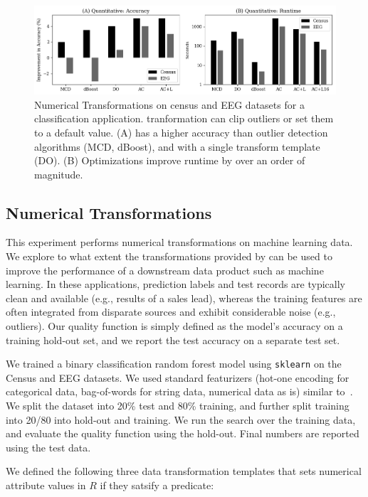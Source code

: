 \begin{figure}
    \centering
    \includegraphics[width=\columnwidth]{exp/exp2.png}
    \caption{\small Numerical Transformations on census and EEG datasets for a classification application.  \sys tranformation can clip outliers or set them to a default value. (A) \sys has a higher accuracy than outlier detection algorithms (MCD, dBoost), and \sys with a single transform template (DO).  (B) Optimizations improve \sys runtime by over an order of magnitude.  \label{exp2a}}
\end{figure}

\subsection{Numerical Transformations}\label{s:expquant}
This experiment performs numerical transformations on machine learning data.  We explore to what extent the transformations provided by \sys can be used to improve the performance of a downstream data product such as machine learning. In these applications, prediction labels and test records are typically clean and available (e.g., results of a sales lead), whereas the training features are often integrated from disparate sources and exhibit considerable noise (e.g., outliers).  Our quality function is simply defined as the model's accuracy on a training hold-out set, and we report the test accuracy on a separate test set.

We trained a binary classification random forest model using \texttt{sklearn} on the Census and EEG datasets.  We used standard featurizers (hot-one encoding for categorical data, bag-of-words for string data, numerical data as is) similar to~\cite{gokhale2014corleone}. 
We split the dataset into 20\% test and 80\% training, and further split training into 20/80 into hold-out and training.  We run the search over the training data, and evaluate the quality function using the hold-out.  Final numbers are reported using the test data.

We defined the following three data transformation templates that sets numerical attribute values in $R$ if they satsify a predicate:

